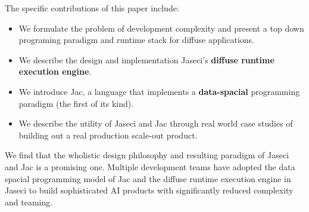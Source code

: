 The specific contributions of this paper include:
\begin{itemize}
    \item We formulate the problem of development complexity and present a top down programing paradigm and runtime stack for diffuse applications.
    \item We describe the design and implementation Jaseci's \textbf{diffuse runtime execution engine}.
    \item We introduce Jac, a language that implements a \textbf{data-spacial} programming paradigm (the first of its kind).
    \item We describe the utility of Jaseci and Jac through real world case studies of building out a real production scale-out product.
\end{itemize}

We find that the wholistic design philosophy and resulting paradigm of Jaseci and Jac is a promising one.
Multiple development teams have adopted the data spacial programming model of Jac and the diffuse runtime execution engine in Jaseci to build sophisticated AI products with significantly reduced complexity and teaming.